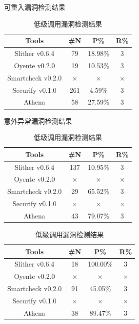 \begin{table}[htbp]
  \centering
  \begin{minipage}[t]{0.48\textwidth}
  \caption{可重入漏洞检测结果}
    \begin{tabular}{cccc}
    \toprule
    Tools & \#N & P\% & R\% \\
    \midrule
    Slither v0.6.4 & 79    & 18.98\%     & 3 \\
    Oyente v0.2.0 & 19  & 10.53\%     & 3 \\
    Smartcheck v0.2.0 & $\times$     & $\times$  & $\times$  \\
    Securify v0.1.0 &  261    & 4.59\%  & 3 \\
    Athena & 58   & 27.59\%     & 3 \\
    \bottomrule
    \end{tabular}%
  \label{tab:eval_reentrancy}%
  \end{minipage}
  \begin{minipage}[t]{0.48\textwidth}
    \caption{意外异常漏洞检测结果}
    \begin{tabular}{cccc}
    \toprule
    Tools & \#N & P\% & R\% \\
    \midrule
    Slither v0.6.4 & 137  & 10.95\%   & 3 \\
    Oyente v0.2.0 & $\times$ & $\times$  & $\times$ \\
    Smartcheck v0.2.0 & 29  & 65.52\%   & 3 \\
    Securify v0.1.0 & $\times$  & $\times$  & $\times$ \\
    Athena & 43   & 79.07\%     & 3 \\
    \bottomrule
    \end{tabular}%
  \label{tab:eval_revert}%
  \end{minipage}
  \begin{minipage}[t]{0.48\textwidth}
    \caption{低级调用漏洞检测结果}
    \begin{tabular}{cccc}
    \toprule
    Tools & \#N & P\% & R\% \\
    \midrule
    Slither v0.6.4 & 18   & 100.00\%     & 3 \\
    Oyente v0.2.0 & $\times$ & $\times$ & $\times$ \\
    Smartcheck v0.2.0 & 91     & 45.05\%     & 3 \\
    Securify v0.1.0 & $\times$ & $\times$ & $\times$ \\
    Athena &  38  & 89.47\%    & 3 \\
    \bottomrule
    \end{tabular}%

\end{minipage}
\end{table}
